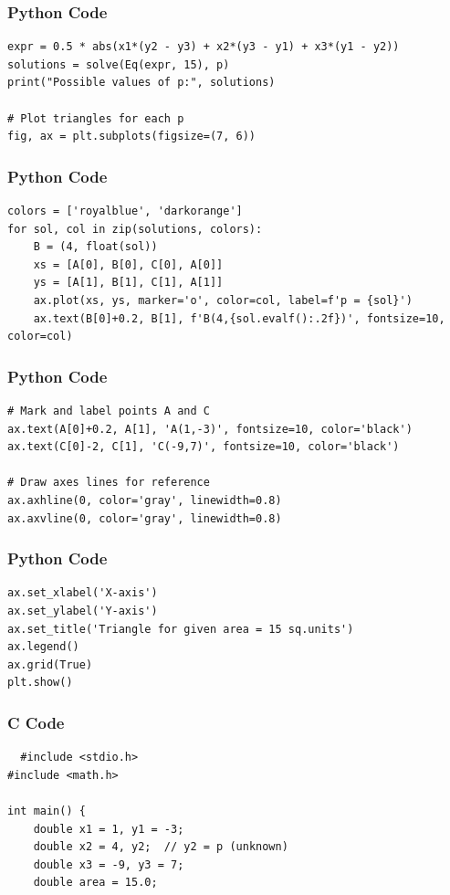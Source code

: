 \documentclass{beamer}
\begin{document}
\begin{frame}[fragile]
    \frametitle{Python Code}

    \begin{lstlisting}
expr = 0.5 * abs(x1*(y2 - y3) + x2*(y3 - y1) + x3*(y1 - y2))
solutions = solve(Eq(expr, 15), p)
print("Possible values of p:", solutions)

# Plot triangles for each p
fig, ax = plt.subplots(figsize=(7, 6))

    \end{lstlisting}
\end{frame}

\begin{frame}[fragile]
    \frametitle{Python Code}

    \begin{lstlisting}
colors = ['royalblue', 'darkorange']
for sol, col in zip(solutions, colors):
    B = (4, float(sol))
    xs = [A[0], B[0], C[0], A[0]]
    ys = [A[1], B[1], C[1], A[1]]
    ax.plot(xs, ys, marker='o', color=col, label=f'p = {sol}')
    ax.text(B[0]+0.2, B[1], f'B(4,{sol.evalf():.2f})', fontsize=10, color=col)
    \end{lstlisting}
\end{frame}

\begin{frame}[fragile]
    \frametitle{Python Code}

    \begin{lstlisting}
# Mark and label points A and C
ax.text(A[0]+0.2, A[1], 'A(1,-3)', fontsize=10, color='black')
ax.text(C[0]-2, C[1], 'C(-9,7)', fontsize=10, color='black')

# Draw axes lines for reference
ax.axhline(0, color='gray', linewidth=0.8)
ax.axvline(0, color='gray', linewidth=0.8)
\end{lstlisting}
\end{frame}

 
\begin{frame}[fragile]
    \frametitle{Python Code}

    \begin{lstlisting}
ax.set_xlabel('X-axis')
ax.set_ylabel('Y-axis')
ax.set_title('Triangle for given area = 15 sq.units')
ax.legend()
ax.grid(True)
plt.show()
\end{lstlisting}
\end{frame}





\begin{frame}[fragile]
\frametitle{C Code}
\begin{lstlisting}
  #include <stdio.h>
#include <math.h>

int main() {
    double x1 = 1, y1 = -3;
    double x2 = 4, y2;  // y2 = p (unknown)
    double x3 = -9, y3 = 7;
    double area = 15.0;
\end{lstlisting}
\end{frame}
\end{document}
